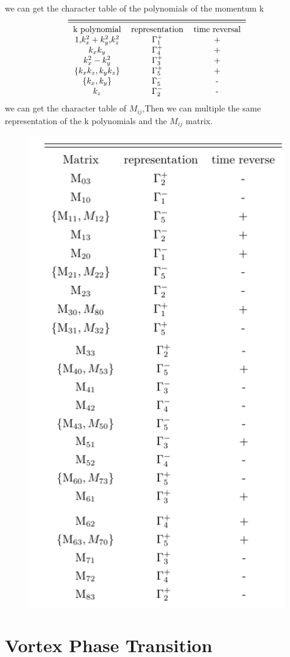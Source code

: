 \documentclass[5pt]{article}
\begin{document}
we can get the character table of the polynomials
of the momentum k
\begin{align}
	\nonumber
	\begin{tabular}{ccc}
		\toprule
		\midrule
		k polynomial & representation & time reversal \\
		1,$k_x^2+k_y^2$,$k_z^2$ &$\Gamma_1^{+}$&+\\
		$k_xk_y$&$\Gamma_4^{+}$&+\\
		$k_x^2-k_y^2$&$\Gamma_3^{+}$&+\\
		$\{k_xk_z,k_yk_z\}$&$\Gamma_5^{+}$&+\\
		$\{k_x,k_y\}$&$\Gamma_5^{-}$&-\\
		$k_z$&$\Gamma_2^{-}$&-
	\end{tabular}
\end{align}
we can get the character table of $M_{ij}$,Then we can multiple the same representation of the k polynomials and the $M_{ij}$ matrix.

\begin{figure}[H]
	\centering
	\includegraphics[scale=0.8]{figure/2}
	\caption{}
	\label{}
\end{figure}




\section{Vortex Phase Transition}
\end{document}

